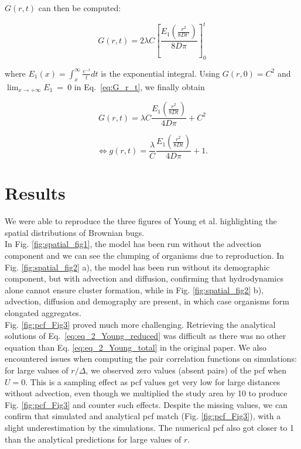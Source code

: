 $G(r,t)$ can then be computed:

\begin{equation}
G(r,t)=2\lambda C\left[\frac{E_1 \left(\frac{r^{2}}{8Dt'}\right)}{8D\pi}\right]_{0}^{t}\label{eq:G_r_t}
\end{equation}

where $E_1(x)=\int_x^\infty \frac{e^{-t}}{t}dt$ is the exponential integral. Using $G(r,0)=C^{2}$ and
$\lim_{x\rightarrow+\infty}E_1~=~0$ in Eq.~\ref{eq:G_r_t}, we finally obtain

\begin{equation}
G(r,t)=\lambda C\frac{E_1\left(\frac{r^{2}}{8Dt}\right)}{4D\pi}+C^{2}
\end{equation}

\begin{equation}
\Leftrightarrow g(r,t)=\frac{\lambda}{C}\frac{E_1\left(\frac{r^{2}}{8Dt}\right)}{4D\pi}+1.
\end{equation}

\section*{Results}

We were able to reproduce the three figures of Young et al. \cite{young_reproductive_2001} highlighting the spatial distributions of Brownian bugs.\\

In Fig. \ref{fig:spatial_fig1}, the model has been run without the advection component and we can see the clumping of organisms due to reproduction. In Fig. \ref{fig:spatial_fig2} a), the model has been run without its demographic component, but with advection and diffusion, confirming that hydrodynamics alone cannot ensure cluster formation, while in Fig.  \ref{fig:spatial_fig2} b), advection, diffusion and demography are present, in which case organisms form elongated aggregates.\\
  
Fig. \ref{fig:pcf_Fig3} proved much more challenging. Retrieving the analytical solutions of Eq.~\ref{eq:eq_2_Young_reduced} was difficult as there was no other equation than Eq. \ref{eq:eq_2_Young_total} in the original paper. We also encountered issues when computing the pair correlation functions on simulations: for large values of $r/\Delta$, we observed zero values (absent pairs) of the pcf when $U=0$. This is a sampling effect as pcf values get very low for large distances without advection, even though we multiplied the study area by 10 to produce Fig.  \ref{fig:pcf_Fig3} and counter such effects. Despite the missing values, we can confirm that simulated and analytical pcf match (Fig. \ref{fig:pcf_Fig3}), with a slight underestimation by the simulations. The numerical pcf also got closer to 1 than the analytical predictions for large values of $r$.

